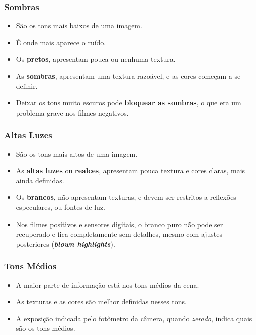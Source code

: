 \begin{frame}
    \frametitle{Sombras}
    \begin{itemize}
      \item São os tons mais baixos de uma imagem.
      \item É onde mais aparece o ruído.
      \item Os \textbf{pretos}, apresentam pouca ou nenhuma textura.
      \item As \textbf{sombras}, apresentam uma textura razoável, e as cores
      começam a se definir.
      \item Deixar os tons muito escuros pode \textbf{bloquear as sombras}, o que era
      um problema grave nos filmes negativos.
    \end{itemize}
\end{frame}


\begin{frame}
    \frametitle{Altas Luzes}
    \begin{itemize}
      \item São os tons mais altos de uma imagem.
      \item As \textbf{altas luzes} ou \textbf{realces}, apresentam pouca textura e cores
      claras, mais ainda definidas.
      \item Os \textbf{brancos}, não apresentam texturas, e devem ser restritos a
      reflexões especulares, ou fontes de luz.
      \item Nos filmes positivos e sensores digitais, o branco puro não pode ser
      recuperado e fica completamente sem detalhes, mesmo com ajustes posteriores
      (\textbf{\textit{blown highlights}}).
    \end{itemize}
\end{frame}


\begin{frame}
    \frametitle{Tons Médios}
    \begin{itemize}
      \item A maior parte de informação está nos tons médios da cena.
      \item As texturas e as cores são melhor definidas nesses tons.
      \item A exposição indicada pelo fotômetro da câmera, quando \textit{zerado},
      indica quais são os tons médios.
    \end{itemize}
\end{frame}

